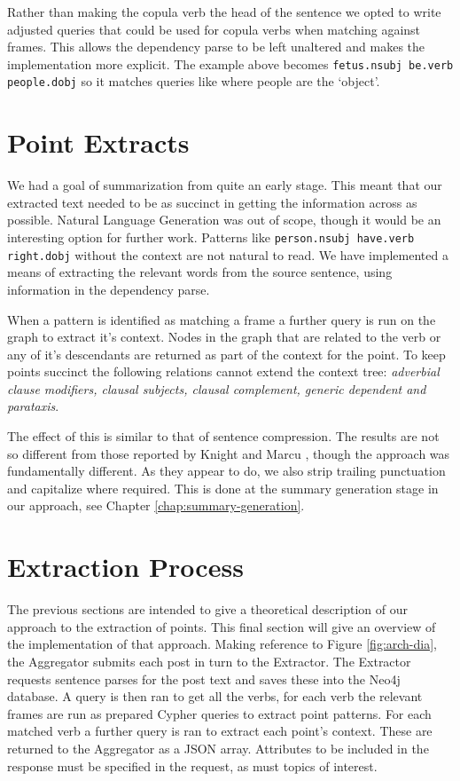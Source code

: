       Rather than making the copula verb the head of the sentence we opted to write adjusted queries that could be used for copula verbs when matching against frames. This allows the dependency parse to be left unaltered and makes the implementation more explicit. The example above becomes \texttt{fetus.nsubj be.verb people.dobj} so it matches queries like where people are the `object'.

  \section{Point Extracts}
    We had a goal of summarization from quite an early stage. This meant that our extracted text needed to be as succinct in getting the information across as possible. Natural Language Generation was out of scope, though it would be an interesting option for further work. Patterns like \texttt{person.nsubj have.verb right.dobj} without the context are not natural to read. We have implemented a means of extracting the relevant words from the source sentence, using information in the dependency parse.

    When a pattern is identified as matching a frame a further query is run on the graph to extract it's context. Nodes in the graph that are related to the verb or any of it's descendants are returned as part of the context for the point. To keep points succinct the following relations cannot extend the context tree: \textit{adverbial clause modifiers, clausal subjects, clausal complement, generic dependent and parataxis}.

    The effect of this is similar to that of sentence compression. The results are not so different from those reported by Knight and Marcu \cite{knight2000statistics}, though the approach was fundamentally different. As they appear to do, we also strip trailing punctuation and capitalize where required. This is done at the summary generation stage in our approach, see Chapter \ref{chap:summary-generation}.

  \section{Extraction Process}
    The previous sections are intended to give a theoretical description of our approach to the extraction of points. This final section will give an overview of the implementation of that approach.
    Making reference to Figure \ref{fig:arch-dia}, the Aggregator submits each post in turn to the Extractor. The Extractor requests sentence parses for the post text and saves these into the Neo4j database. A query is then ran to get all the verbs, for each verb the relevant frames are run as prepared Cypher queries to extract point patterns. For each matched verb a further query is ran to extract each point's context. These are returned to the Aggregator as a JSON array. Attributes to be included in the response must be specified in the request, as must topics of interest.
